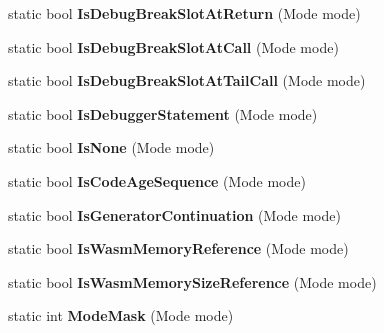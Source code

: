\begin{DoxyCompactItemize}
\item 
static bool {\bfseries Is\+Debug\+Break\+Slot\+At\+Return} (Mode mode)\hypertarget{classv8_1_1internal_1_1_reloc_info_a093597608d1a5621f8a3d01f087d7e49}{}\label{classv8_1_1internal_1_1_reloc_info_a093597608d1a5621f8a3d01f087d7e49}

\item 
static bool {\bfseries Is\+Debug\+Break\+Slot\+At\+Call} (Mode mode)\hypertarget{classv8_1_1internal_1_1_reloc_info_a4b37fef0eef3bc660b6483e4c9f861a5}{}\label{classv8_1_1internal_1_1_reloc_info_a4b37fef0eef3bc660b6483e4c9f861a5}

\item 
static bool {\bfseries Is\+Debug\+Break\+Slot\+At\+Tail\+Call} (Mode mode)\hypertarget{classv8_1_1internal_1_1_reloc_info_a63b6a2309974e3e5d7a016a81dd06d2a}{}\label{classv8_1_1internal_1_1_reloc_info_a63b6a2309974e3e5d7a016a81dd06d2a}

\item 
static bool {\bfseries Is\+Debugger\+Statement} (Mode mode)\hypertarget{classv8_1_1internal_1_1_reloc_info_a94a4a12e5eedbcbd0f7c9a7e9f7f64a3}{}\label{classv8_1_1internal_1_1_reloc_info_a94a4a12e5eedbcbd0f7c9a7e9f7f64a3}

\item 
static bool {\bfseries Is\+None} (Mode mode)\hypertarget{classv8_1_1internal_1_1_reloc_info_a4ab994cff72287120b2122ae80285960}{}\label{classv8_1_1internal_1_1_reloc_info_a4ab994cff72287120b2122ae80285960}

\item 
static bool {\bfseries Is\+Code\+Age\+Sequence} (Mode mode)\hypertarget{classv8_1_1internal_1_1_reloc_info_aeaa71c56924a1875eb74b107d6c0e403}{}\label{classv8_1_1internal_1_1_reloc_info_aeaa71c56924a1875eb74b107d6c0e403}

\item 
static bool {\bfseries Is\+Generator\+Continuation} (Mode mode)\hypertarget{classv8_1_1internal_1_1_reloc_info_aa3b35b26cdc74eb93c27ca4e62377a43}{}\label{classv8_1_1internal_1_1_reloc_info_aa3b35b26cdc74eb93c27ca4e62377a43}

\item 
static bool {\bfseries Is\+Wasm\+Memory\+Reference} (Mode mode)\hypertarget{classv8_1_1internal_1_1_reloc_info_a30df304dcdb0db6c025cd3cf04f5d822}{}\label{classv8_1_1internal_1_1_reloc_info_a30df304dcdb0db6c025cd3cf04f5d822}

\item 
static bool {\bfseries Is\+Wasm\+Memory\+Size\+Reference} (Mode mode)\hypertarget{classv8_1_1internal_1_1_reloc_info_af900b30295498bc896ebdde51e6a076b}{}\label{classv8_1_1internal_1_1_reloc_info_af900b30295498bc896ebdde51e6a076b}

\item 
static int {\bfseries Mode\+Mask} (Mode mode)\hypertarget{classv8_1_1internal_1_1_reloc_info_a002820c955566503335ea1a6ec4a5898}{}\label{classv8_1_1internal_1_1_reloc_info_a002820c955566503335ea1a6ec4a5898}

\end{DoxyCompactItemize}
